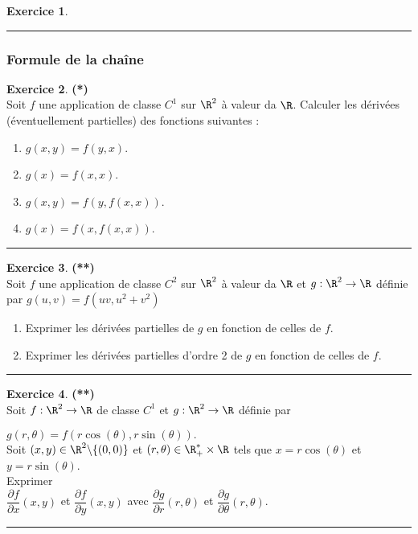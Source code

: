 \documentclass[a4paper,11pt]{article}
\theoremstyle{definition}
\newtheorem{exo}{Exercice} %
\begin{document}
\begin{minipage}{1\linewidth}
\begin{minipage}[t]{0.48\linewidth}
\begin{exo}
			
			\centering\rule{1\linewidth}{0.6pt}\end{exo}
		\subsubsection*{Formule de la chaîne}
		\begin{exo}\textbf{(*)}\quad\\[0.1cm]
			Soit $f$ une application de classe $C^1$ sur $\R^2$ à valeur da $\R$. Calculer les dérivées (éventuellement partielles) des fonctions suivantes :
			
			\begin{enumerate}
				\item $g(x,y)=f(y,x)$.
				\item $g(x)=f(x,x)$.
				\item $g(x,y)=f(y,f(x,x))$.
				\item $g(x)=f(x,f(x,x))$.
			\end{enumerate}

			
			\centering\rule{1\linewidth}{0.6pt}\end{exo}
		
		
		\begin{exo}\textbf{(**)}\quad\\[0.1cm]
			Soit $f$ une application de classe $C^2$ sur $\R^2$ à valeur da $\R$ et $g:\R^2\to\R$ définie par $g(u,v) = f(uv, u^2 + v^2)$
			
			\begin{enumerate}
				\item Exprimer les dérivées partielles de $g$ en fonction de celles de $f$.
				\item Exprimer les dérivées partielles d'ordre 2 de $g$ en fonction de celles de $f$.
			\end{enumerate} 
			
			\centering\rule{1\linewidth}{0.6pt}\end{exo}
		
		\begin{exo}\textbf{(**)}\quad\\[0.1cm]
			Soit $f:\R^2\to\R$ de classe $C^1$ et $g:\R^2\to\R$ définie par 
			
			$g(r,\theta) = f(r\cos(\theta), r\sin(\theta)).$\\[0.15cm]
			
			 Soit $(x,y)\in\R^2\backslash\{(0,0)\}$ et $(r,\theta)\in \R^*_+\times\R$ tels que $x= r\cos(\theta)$ et $y= r\sin(\theta)$.\\Exprimer\\[0.25cm] 
			 
			  $\dfrac{\partial f}{\partial x}(x,y)$ et $\dfrac{\partial f}{\partial y}(x,y)$  avec  $\dfrac{\partial g}{\partial r}(r,\theta)$ et $\dfrac{\partial g}{\partial \theta}(r,\theta)$. 
			
			\centering\rule{1\linewidth}{0.6pt}\end{exo}
		

		
		
\end{minipage}\end{minipage}\newpage
\end{document}
